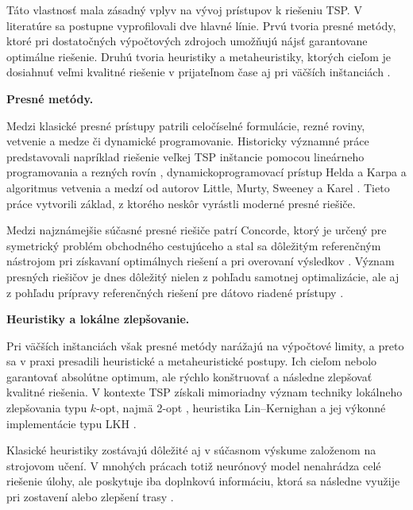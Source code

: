 Táto vlastnosť mala zásadný vplyv na vývoj prístupov k riešeniu TSP.
V literatúre sa postupne vyprofilovali dve hlavné línie. Prvú tvoria
presné metódy, ktoré pri dostatočných výpočtových zdrojoch umožňujú
nájsť garantovane optimálne riešenie. Druhú tvoria heuristiky
a metaheuristiky, ktorých cieľom je dosiahnuť veľmi kvalitné riešenie
v prijateľnom čase aj pri väčších inštanciách
\parencite{matai2010overview,bengio2021mlco}.

\noindent\textbf{Presné metódy.}

Medzi klasické presné prístupy patrili celočíselné formulácie, rezné roviny,
vetvenie a medze či dynamické programovanie. Historicky významné práce
predstavovali napríklad riešenie veľkej TSP inštancie pomocou lineárneho
programovania a rezných rovín \parencite{dantzig1954large},
dynamickoprogramovací prístup Helda a Karpa \parencite{held1962dp}
a algoritmus vetvenia a medzí od autorov Little, Murty, Sweeney a Karel
\parencite{little1963bnb}. Tieto práce vytvorili základ, z ktorého neskôr
vyrástli moderné presné riešiče.

Medzi najznámejšie súčasné presné riešiče patrí Concorde, ktorý je určený
pre symetrický problém obchodného cestujúceho a stal sa dôležitým referenčným
nástrojom pri získavaní optimálnych riešení a pri overovaní výsledkov
\parencite{concorde2003solver}. Význam presných riešičov je dnes dôležitý
nielen z pohľadu samotnej optimalizácie, ale aj z pohľadu prípravy
referenčných riešení pre dátovo riadené prístupy
\parencite{joshi2022generalization,bengio2021mlco}.

\noindent\textbf{Heuristiky a lokálne zlepšovanie.}

Pri väčších inštanciách však presné metódy narážajú na výpočtové limity,
a preto sa v praxi presadili heuristické a metaheuristické postupy.
Ich cieľom nebolo garantovať absolútne optimum, ale rýchlo konštruovať
a následne zlepšovať kvalitné riešenia. V kontexte TSP získali mimoriadny
význam techniky lokálneho zlepšovania typu $k$-opt, najmä 2-opt
\parencite{croes1958twoopt}, heuristika Lin--Kernighan
\parencite{lin1973lk} a jej výkonné implementácie typu LKH
\parencite{helsgaun2000lkh}.

Klasické heuristiky zostávajú dôležité aj v súčasnom výskume založenom
na strojovom učení. V mnohých prácach totiž neurónový model nenahrádza celé
riešenie úlohy, ale poskytuje iba doplnkovú informáciu, ktorá sa následne
využije pri zostavení alebo zlepšení trasy
\parencite{hudson2022gls,xin2021neurolkh,bengio2021mlco}.

